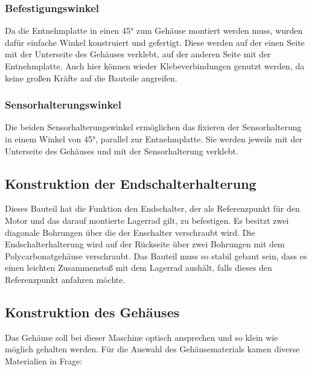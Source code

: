 \subsubsection{Befestigungswinkel}
Da die Entnehmplatte in einen 45° zum Gehäuse montiert werden muss, wurden dafür einfache Winkel konstruiert und gefertigt.
Diese werden auf der einen Seite mit der Unterseite des Gehäuses verklebt, auf der anderen Seite mit der Entnehmplatte.
Auch hier können wieder Klebeverbindungen genutzt werden, da keine großen Kräfte auf die Bauteile angreifen.

\subsubsection{Sensorhalterungswinkel}
Die beiden Sensorhalterungswinkel ermöglichen das fixieren der Sensorhalterung in einem Winkel von 45°, parallel zur
Entnehmplatte. Sie werden jeweils mit der Unterseite des Gehäuses und mit der Sensorhalterung verklebt.

\subsection{Konstruktion der Endschalterhalterung}
Dieses Bauteil hat die Funktion den Endschalter, der als Referenzpunkt für den Motor und das darauf montierte
Lagerrad gilt, zu befestigen. Es besitzt zwei diagonale Bohrungen über die der Enschalter verschraubt wird.
Die Endschalterhalterung wird auf der Rückseite über zwei Bohrungen mit dem Polycarbonatgehäuse verschraubt.
Das Bauteil muss so stabil gebaut sein, dass es einen leichten Zusammenstoß mit dem Lagerrad aushält, falls dieses
den Referenzpunkt anfahren möchte.

\subsection{Konstruktion des Gehäuses}
Das Gehäuse soll bei dieser Maschine optisch ansprechen und so klein wie möglich gehalten werden. Für die Auswahl
des Gehäusematerials kamen diverse Materialien in Frage:

